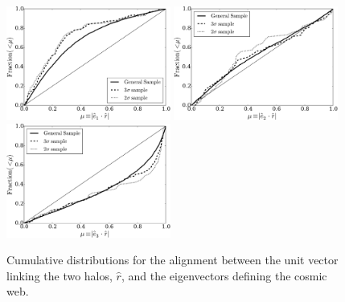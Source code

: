 \documentclass{emulateapj}
\begin{document}
\begin{figure}
\begin{center}
  \includegraphics[width=0.48\textwidth]{alignments_e1_r_all_environments.pdf} 
  \includegraphics[width=0.48\textwidth]{alignments_e2_r_all_environments.pdf} 
  \includegraphics[width=0.48\textwidth]{alignments_e3_r_all_environments.pdf} 
\end{center}
\caption{Cumulative distributions for the alignment between the unit
  vector linking the two halos, $\hat{r}$, and the eigenvectors
  defining the cosmic web.
    \label{fig:alignment_r}}  
\end{figure}


\end{document}
